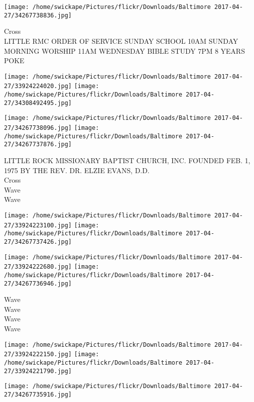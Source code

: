 \documentclass[10pt,letterpaper]{article}
\begin{document}
\vspace{0.25in}
\texttt{[image: /home/swickape/Pictures/flickr/Downloads/Baltimore 2017-04-27/34267738836.jpg]}

Cross\\
LITTLE RMC ORDER OF SERVICE SUNDAY SCHOOL 10AM SUNDAY MORNING WORSHIP 11AM WEDNESDAY BIBLE STUDY 7PM 8 YEARS\\
POKE\\
\pagebreak

\texttt{[image: /home/swickape/Pictures/flickr/Downloads/Baltimore 2017-04-27/33924224020.jpg]}
\texttt{[image: /home/swickape/Pictures/flickr/Downloads/Baltimore 2017-04-27/34308492495.jpg]}

\texttt{[image: /home/swickape/Pictures/flickr/Downloads/Baltimore 2017-04-27/34267738096.jpg]}
\texttt{[image: /home/swickape/Pictures/flickr/Downloads/Baltimore 2017-04-27/34267737876.jpg]}

LITTLE ROCK MISSIONARY BAPTIST CHURCH, INC. FOUNDED FEB. 1, 1975 BY THE REV. DR. ELZIE EVANS, D.D.\\
Cross\\
Wave\\
Wave\\
\pagebreak

\texttt{[image: /home/swickape/Pictures/flickr/Downloads/Baltimore 2017-04-27/33924223100.jpg]}
\texttt{[image: /home/swickape/Pictures/flickr/Downloads/Baltimore 2017-04-27/34267737426.jpg]}

\texttt{[image: /home/swickape/Pictures/flickr/Downloads/Baltimore 2017-04-27/33924222680.jpg]}
\texttt{[image: /home/swickape/Pictures/flickr/Downloads/Baltimore 2017-04-27/34267736946.jpg]}

Wave\\
Wave\\
Wave\\
Wave\\
\pagebreak

\texttt{[image: /home/swickape/Pictures/flickr/Downloads/Baltimore 2017-04-27/33924222150.jpg]}
\texttt{[image: /home/swickape/Pictures/flickr/Downloads/Baltimore 2017-04-27/33924221790.jpg]}

\vspace{0.25in}
\texttt{[image: /home/swickape/Pictures/flickr/Downloads/Baltimore 2017-04-27/34267735916.jpg]}
\end{document}
